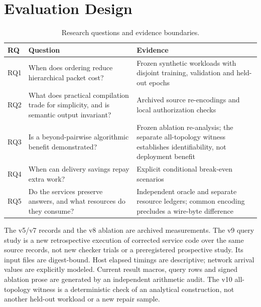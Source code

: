 \section{Evaluation Design}\label{sec:evaluation}
\begin{table}[H]\centering\small
\caption{Research questions and evidence boundaries.}
\begin{tabularx}{\linewidth}{@{}p{.06\linewidth}p{.35\linewidth}X@{}}\toprule
RQ & Question & Evidence\\\midrule
RQ1 & When does ordering reduce hierarchical packet cost? & Frozen synthetic workloads with disjoint training, validation and held-out epochs\\
RQ2 & What does practical compilation trade for simplicity, and is semantic output invariant? & Archived source re-encodings and local authorization checks\\
RQ3 & Is a beyond-pairwise algorithmic benefit demonstrated? & Frozen ablation re-analysis; the separate all-topology witness establishes identifiability, not deployment benefit\\
RQ4 & When can delivery savings repay extra work? & Explicit conditional break-even scenarios\\
RQ5 & Do the services preserve answers, and what resources do they consume? & Independent oracle and separate resource ledgers; common encoding precludes a wire-byte difference\\\bottomrule
\end{tabularx}
\end{table}
The v5/v7 records and the v8 ablation are archived measurements. The v9
query study is a new retrospective execution of corrected service code over
the same source records, not new checker trials or a preregistered prospective
study. Its input files are digest-bound. Host elapsed timings are descriptive;
network arrival values are explicitly modeled. Current result macros, query
rows and signed ablation prose are generated by an independent arithmetic audit.
The v10 all-topology witness is a deterministic check of an analytical
construction, not another held-out workload or a new repair sample.
